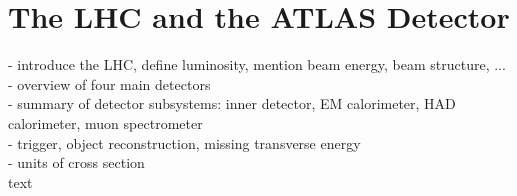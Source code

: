 \clearpage
\section{The LHC and the ATLAS Detector}

- introduce the LHC, define luminosity, mention beam energy, beam structure, ...\\
- overview of four main detectors\\
- summary of detector subsystems: inner detector, EM calorimeter, HAD calorimeter, muon spectrometer\\
- trigger, object reconstruction, missing transverse energy\\
- units of cross section\\

\clearpage
text
\clearpage

